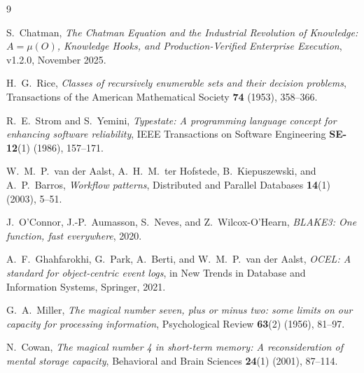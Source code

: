 \documentclass[11pt,oneside]{book}
\theoremstyle{definition}
\theoremstyle{plain}
\theoremstyle{remark}
\begin{document}
\begin{thebibliography}{9}

S.~Chatman,
\emph{The Chatman Equation and the Industrial Revolution of Knowledge:
$A=\mu(O)$, Knowledge Hooks, and Production-Verified Enterprise Execution},
v1.2.0, November 2025.

H.~G.~Rice,
\emph{Classes of recursively enumerable sets and their decision problems},
Transactions of the American Mathematical Society \textbf{74} (1953), 358--366.

R.~E.~Strom and S.~Yemini,
\emph{Typestate: A programming language concept for enhancing software reliability},
IEEE Transactions on Software Engineering \textbf{SE-12}(1) (1986), 157--171.

W.~M.~P.~van der Aalst, A.~H.~M.~ter Hofstede, B.~Kiepuszewski, and A.~P.~Barros,
\emph{Workflow patterns},
Distributed and Parallel Databases \textbf{14}(1) (2003), 5--51.

J.~O'Connor, J.-P.~Aumasson, S.~Neves, and Z.~Wilcox-O'Hearn,
\emph{BLAKE3: One function, fast everywhere},
2020.

A.~F.~Ghahfarokhi, G.~Park, A.~Berti, and W.~M.~P.~van der Aalst,
\emph{OCEL: A standard for object-centric event logs},
in New Trends in Database and Information Systems, Springer, 2021.

G.~A.~Miller,
\emph{The magical number seven, plus or minus two: some limits on our capacity
for processing information},
Psychological Review \textbf{63}(2) (1956), 81--97.

N.~Cowan,
\emph{The magical number 4 in short-term memory: A reconsideration of mental
storage capacity},
Behavioral and Brain Sciences \textbf{24}(1) (2001), 87--114.

\end{thebibliography}
\end{document}
